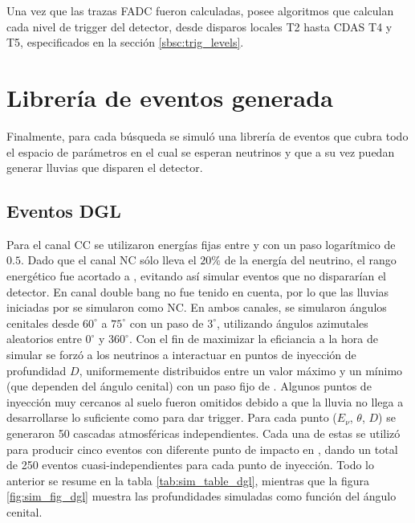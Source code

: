 		Una vez que las trazas FADC fueron calculadas, \Offline{} posee algoritmos que calculan cada nivel de trigger del detector, desde disparos locales T2 hasta CDAS T4 y T5, especificados en la secci\'on \ref{sbsc:trig_levels}.
		
	\section{Librería de eventos generada}
	
	Finalmente, para cada búsqueda se simuló una librería de eventos que cubra todo el espacio de parámetros en el cual se esperan neutrinos y que a su vez puedan generar lluvias que disparen el detector.
	
		\subsection{Eventos DGL}
		
		Para el canal CC se utilizaron energías fijas entre  y  con un paso logarítmico de $0.5$. Dado que el canal NC sólo lleva el $20\%$ de la energía del neutrino, el rango energético fue acortado a , evitando así simular eventos que no dispararían el detector.
		En canal double bang no fue tenido en cuenta, por lo que las lluvias iniciadas por \nutau{} se simularon como NC.
		En ambos canales, se simularon ángulos cenitales desde $60^\circ$ a $75^\circ$ con un paso de $3^\circ$, utilizando ángulos azimutales aleatorios entre $0^\circ$ y $360^\circ$.
		Con el fin de maximizar la eficiancia a la hora de simular se forzó a los neutrinos a interactuar en puntos de inyección de profundidad $D$, uniformemente distribuidos entre un valor máximo y un mínimo (que dependen del ángulo cenital) con un paso fijo de .
		Algunos puntos de inyección muy cercanos al suelo fueron omitidos debido a que la lluvia no llega a desarrollarse lo suficiente como para dar trigger.
		Para cada punto ($E_{\nu}$, $\theta$, $D$) se generaron 50 cascadas atmosféricas independientes.
		Cada una de estas se utilizó para producir cinco eventos con diferente punto de impacto en \Offline{}, dando un total de 250 eventos cuasi-independientes para cada punto de inyección.
		Todo lo anterior se resume en la tabla \ref{tab:sim_table_dgl}, mientras que la figura \ref{fig:sim_fig_dgl} muestra las profundidades simuladas como función del ángulo cenital.
		
